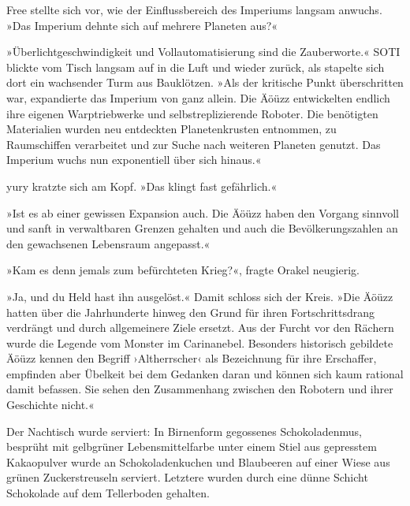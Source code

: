 Free stellte sich vor, wie der Einflussbereich des Imperiums langsam anwuchs. »Das Imperium dehnte sich auf mehrere Planeten aus?«

»Überlichtgeschwindigkeit und Vollautomatisierung sind die Zauberworte.« SOTI blickte vom Tisch langsam auf in die Luft und wieder zurück, als stapelte sich dort ein wachsender Turm aus Bauklötzen. »Als der kritische Punkt überschritten war, expandierte das Imperium von ganz allein. Die Äöüzz entwickelten endlich ihre eigenen Warptriebwerke und selbstreplizierende Roboter. Die benötigten Materialien wurden neu entdeckten Planetenkrusten entnommen, zu Raumschiffen verarbeitet und zur Suche nach weiteren Planeten genutzt. Das Imperium wuchs nun exponentiell über sich hinaus.«

yury kratzte sich am Kopf. »Das klingt fast gefährlich.«

»Ist es ab einer gewissen Expansion auch. Die Äöüzz haben den Vorgang sinnvoll und sanft in verwaltbaren Grenzen gehalten und auch die Bevölkerungszahlen an den gewachsenen Lebensraum angepasst.«

»Kam es denn jemals zum befürchteten Krieg?«, fragte Orakel neugierig.

»Ja, und du Held hast ihn ausgelöst.« Damit schloss sich der Kreis. »Die Äöüzz hatten über die Jahrhunderte hinweg den Grund für ihren Fortschrittsdrang verdrängt und durch allgemeinere Ziele ersetzt. Aus der Furcht vor den Rächern wurde die Legende vom Monster im Carinanebel. Besonders historisch gebildete Äöüzz kennen den Begriff ›Altherrscher‹ als Bezeichnung für ihre Erschaffer, empfinden aber Übelkeit bei dem Gedanken daran und können sich kaum rational damit befassen. Sie sehen den Zusammenhang zwischen den Robotern und ihrer Geschichte nicht.«

Der Nachtisch wurde serviert: In Birnenform gegossenes Schokoladenmus, besprüht mit gelbgrüner Lebensmittelfarbe unter einem Stiel aus gepresstem Kakaopulver wurde an Schokoladenkuchen und Blaubeeren auf einer Wiese aus grünen Zuckerstreuseln serviert. Letztere wurden durch eine dünne Schicht Schokolade auf dem Tellerboden gehalten.

